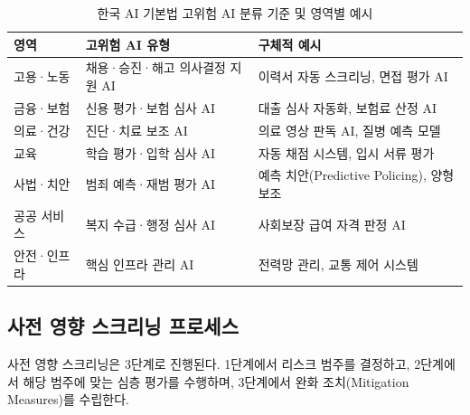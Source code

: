 \begin{table}[htbp]
\centering
\caption{한국 AI 기본법 고위험 AI 분류 기준 및 영역별 예시}
\label{tab:korean_ai_act_highrisk}
\begin{tabularx}{\textwidth}{p{2.5cm}Xp{4cm}}
\toprule
\textbf{영역} & \textbf{고위험 AI 유형} & \textbf{구체적 예시} \\
\midrule
고용·노동 & 채용·승진·해고 의사결정 지원 AI & 이력서 자동 스크리닝, 면접 평가 AI \\
금융·보험 & 신용 평가·보험 심사 AI & 대출 심사 자동화, 보험료 산정 AI \\
의료·건강 & 진단·치료 보조 AI & 의료 영상 판독 AI, 질병 예측 모델 \\
교육 & 학습 평가·입학 심사 AI & 자동 채점 시스템, 입시 서류 평가 \\
사법·치안 & 범죄 예측·재범 평가 AI & 예측 치안(Predictive Policing), 양형 보조 \\
공공 서비스 & 복지 수급·행정 심사 AI & 사회보장 급여 자격 판정 AI \\
안전·인프라 & 핵심 인프라 관리 AI & 전력망 관리, 교통 제어 시스템 \\
\bottomrule
\end{tabularx}
\end{table}

\subsection{사전 영향 스크리닝 프로세스}
\label{sec:8.3.3}

사전 영향 스크리닝은 3단계로 진행된다. 1단계에서 리스크 범주를 결정하고, 2단계에서 해당 범주에 맞는 심층 평가를 수행하며, 3단계에서 완화 조치(Mitigation Measures)를 수립한다.

